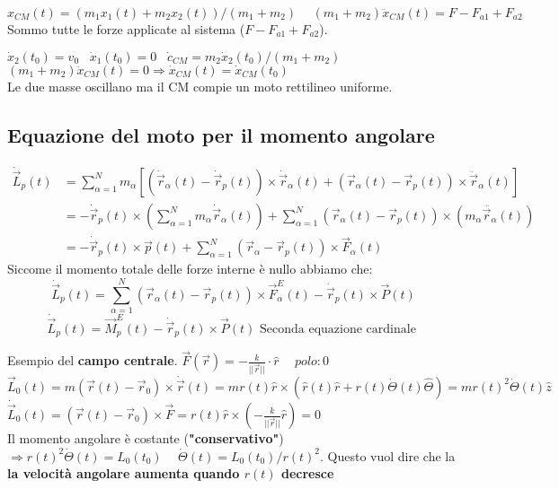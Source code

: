 \begin{example}
    $x_{CM}(t) = (m_1 x_1(t) + m_2x_2(t))/(m_1 + m_2) \hspace{15pt} (m_1 + m_2)\ddot{x}_{CM}(t) = F - F_{a1} + F_{a2}$ 
    Sommo tutte le forze applicate al sistema ($F - F_{a1} + F_{a2}$).
\end{example}

\begin{example}
    $\dot{x}_2(t_0) = v_0 \hspace{10pt} \dot{x}_1(t_0) = 0 \hspace{10pt} \dot{c}_{CM} = m_2\dot{x}_2(t_0)/(m_1 + m_2)$\\
    $(m_1 + m_2)\ddot{x}_{CM}(t) = 0 \Rightarrow \dot{x}_{CM}(t) = \dot{x}_{CM}(t_0)$\\
    Le due masse oscillano ma il CM compie un moto rettilineo uniforme.
\end{example}

\subsection{Equazione del moto per il momento angolare}
\begin{equation*}
    \begin{split}
        \dot{\vec{L}}_p(t) & = \sum_{\alpha=1}^{N}m_{\alpha}[(\dot{\vec{r}}_{\alpha}(t) - \dot{\vec{r}}_p(t)) \times \dot{\vec{r}}_{\alpha}(t) + (\vec{r}_{\alpha}(t) - \vec{r}_p(t)) \times \ddot{\vec{r}}_{\alpha}(t)]\\
                           & = -\dot{\vec{r}}_p(t) \times (\sum_{\alpha=1}^{N}m_{\alpha}\dot{\vec{r}}_{\alpha}(t)) + \sum_{\alpha=1}^{N}(\vec{r}_{\alpha}(t) - \vec{r}_p(t)) \times (m_{\alpha}\ddot{\vec{r}_{\alpha}}(t))\\
                           & = -\dot{\vec{r}}_p(t) \times \vec{p}(t) + \sum_{\alpha=1}^{N} (\vec{r}_{\alpha} - \vec{r}_p(t)) \times \vec{F}_{\alpha}(t)
    \end{split}
\end{equation*}
Siccome il momento totale delle forze interne è nullo abbiamo che:
$$\dot{\vec{L}}_p(t) = \sum_{\alpha=1}^{N}(\vec{r}_{\alpha}(t) - \vec{r}_p(t)) \times \vec{F}_{\alpha}^E(t) - \dot{\vec{r}}_p(t) \times \vec{P}(t)$$
$$\dot{\vec{L}}_p(t) = \vec{M}_p^E(t) - \dot{\vec{r}}_p(t) \times \vec{P}(t) \text{ Seconda equazione cardinale }$$
\begin{example}
    Esempio del \textbf{campo centrale}. $\vec{F}(\vec{r}) = -\frac{k}{||\vec{r}||}\cdot \hat{r} \hspace{15pt} polo: 0$
    $$\vec{L}_0(t) = m(\vec{r}(t) - \vec{r}_0) \times \dot{\vec{r}}(t) = mr(t) \hat{r} \times (\hat{r}(t) \hat{r} + r(t)\dot{\Theta}(t)\hat{\Theta}) = mr(t)^2\dot{\Theta}(t)\hat{z}$$
    $\dot{\vec{L}}_0(t) = (\vec{r}(t) - \vec{r}_0) \times \vec{F} = r(t)\hat{r} \times (-\frac{k}{||\vec{r}||}\hat{r}) = 0$\\
    Il momento angolare è costante (\textbf{"conservativo"}) $\Rightarrow r(t)^2 \dot{\Theta}(t) = L_0(t_0) \hspace{15pt} \dot{\Theta}(t) = L_0(t_0)/r(t)^2$. Questo vuol dire che la \textbf{la velocità
    angolare aumenta quando $r(t)$ decresce}
\end{example}